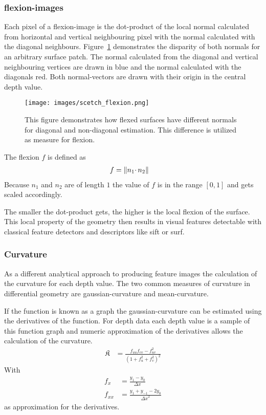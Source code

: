 \subsubsection{\Glspl{flexion-image}}\label{flexion-image-section}

Each pixel of a \Gls{flexion-image} is the dot-product of the local normal
calculated from horizontal and vertical neighbouring pixel with the
normal calculated with the diagonal neighbours.
Figure~\ref{fig:flexion-image-scetched} demonstrates the disparity of both normals for an arbitrary surface patch.
The normal calculated from the diagonal and vertical neighbouring vertices are drawn in blue and the normal calculated with the diagonals red.
Both normal-vectors are drawn with their origin in the central depth value.

\begin{figure}[H]
    \centering
    \texttt{[image: images/scetch\_flexion.png]}
    \caption[Schematic Representation of Flexion]{This figure demonstrates how flexed surfaces have different normals for diagonal and non-diagonal estimation. This difference is utilized as measure for flexion.}%
    \label{fig:flexion-image-scetched}
\end{figure}

The flexion $f$ is defined as
\begin{align}
    f &= \lVert n_1 \cdotp n_2\rVert
\end{align}
Because $n_1$ and $n_2$ are of length $1$ the value of $f$ is in the range $[0, 1]$ and gets scaled accordingly.

The smaller the dot-product gets, the higher is the local flexion of the
surface. This local property of the geometry then results in visual
features detectable with classical feature detectors and descriptors like
\Gls{sift} or \Gls{surf}.

\subsubsection{Curvature}

As a different analytical approach to producing feature images the calculation of the \gls{curvature} for each depth value.
The two common measures of curvature in differential geometry are \gls{gaussian-curvature} and \gls{mean-curvature}\cite{Kuhnel2008}.

If the function is known as a graph the \Gls{gaussian-curvature} can be estimated using the derivatives of the function.
For depth data each depth value is a sample of this function graph and numeric approximation of the derivatives allows the calculation of the curvature.
\begin{align}
    \mathfrak{K} &= \frac{f_{uu} f_{vv} - f_{uv}^2}{{(1 + f_u^2 + f_v^2)}^2}
\end{align}
With
\begin{align*}
    f_{x} &= \frac{y_1 - y_0}{\Delta x} \\
    f_{xx} &= \frac{y_1 + y_{-1} - 2 y_0}{{\Delta x}^2}
\end{align*}
as approximation for the derivatives.

